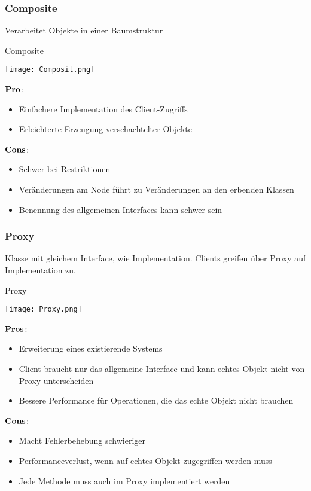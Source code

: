 \subsubsection{Composite}
Verarbeitet Objekte in einer Baumstruktur
\begin{table}[H]
\caption{Composite}
\texttt{[image: Composit.png]}
\end{table}
\begin{multicols}{2}
$\bold{Pro}$:
\begin{itemize}
	\item Einfachere Implementation des Client-Zugriffs
	\item Erleichterte Erzeugung verschachtelter Objekte
\end{itemize}	
\columnbreak
$\bold{Cons}$:
\begin{itemize}
	\item Schwer bei Restriktionen
	\item Veränderungen am Node führt zu Veränderungen an den erbenden Klassen
	\item Benennung des allgemeinen Interfaces kann schwer sein 
\end{itemize}
\end{multicols}
\subsubsection{Proxy}
Klasse mit gleichem Interface, wie Implementation. Clients greifen über Proxy auf Implementation zu.
\begin{table}[H]
\caption{Proxy}
\texttt{[image: Proxy.png]}	
\end{table}
\begin{multicols}{2}
$\bold{Pros}$:
\begin{itemize}
	\item Erweiterung eines existierende Systems
	\item Client braucht nur das allgemeine Interface und kann echtes Objekt nicht von Proxy unterscheiden
	\item Bessere Performance für Operationen, die das echte Objekt nicht brauchen
\end{itemize}
\columnbreak
$\bold{Cons}$:
\begin{itemize}
	\item Macht Fehlerbehebung schwieriger
	\item Performanceverlust, wenn auf echtes Objekt zugegriffen werden muss
	\item Jede Methode muss auch im Proxy implementiert werden
\end{itemize}
\end{multicols}
